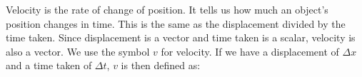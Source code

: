       \label{m38791*id64258}Velocity is the rate of change of position. It tells us how much an object's position changes in time. This is the same as the displacement divided by the time taken. Since displacement is a vector and time taken is a scalar, velocity is also a vector. We use the symbol \begin{math}v\end{math} for velocity. If we have a displacement of \begin{math}\Delta x\end{math} and a time taken of \begin{math}\Delta t\end{math}, \begin{math}v\end{math} is then defined as:\par 
      \label{m38791*id64307}\nopagebreak\noindent{}
